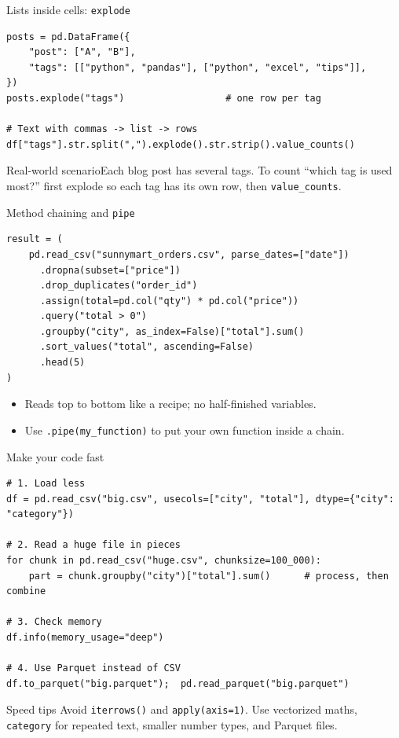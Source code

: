 \documentclass[aspectratio=169,10pt]{beamer}
\newcommand{\code}[1]{\texttt{#1}}
\newcommand{\scenario}[1]{\begin{exampleblock}{Real-world scenario}#1\end{exampleblock}}
\begin{document}
\begin{frame}[fragile]{Lists inside cells: \texttt{explode}}
\begin{lstlisting}
posts = pd.DataFrame({
    "post": ["A", "B"],
    "tags": [["python", "pandas"], ["python", "excel", "tips"]],
})
posts.explode("tags")                  # one row per tag

# Text with commas -> list -> rows
df["tags"].str.split(",").explode().str.strip().value_counts()
\end{lstlisting}
  \scenario{Each blog post has several tags. To count ``which tag is used most?'' first
  explode so each tag has its own row, then \code{value\_counts}.}
\end{frame}

\begin{frame}[fragile]{Method chaining and \texttt{pipe}}
\begin{lstlisting}
result = (
    pd.read_csv("sunnymart_orders.csv", parse_dates=["date"])
      .dropna(subset=["price"])
      .drop_duplicates("order_id")
      .assign(total=pd.col("qty") * pd.col("price"))
      .query("total > 0")
      .groupby("city", as_index=False)["total"].sum()
      .sort_values("total", ascending=False)
      .head(5)
)
\end{lstlisting}
  \begin{itemize}
    \item Reads top to bottom like a recipe; no half-finished variables.
    \item Use \code{.pipe(my\_function)} to put your own function inside a chain.
  \end{itemize}
\end{frame}

\begin{frame}[fragile]{Make your code fast}
\begin{lstlisting}
# 1. Load less
df = pd.read_csv("big.csv", usecols=["city", "total"], dtype={"city": "category"})

# 2. Read a huge file in pieces
for chunk in pd.read_csv("huge.csv", chunksize=100_000):
    part = chunk.groupby("city")["total"].sum()      # process, then combine

# 3. Check memory
df.info(memory_usage="deep")

# 4. Use Parquet instead of CSV
df.to_parquet("big.parquet");  pd.read_parquet("big.parquet")
\end{lstlisting}
  \begin{alertblock}{Speed tips}
    Avoid \code{iterrows()} and \code{apply(axis=1)}. Use vectorized maths, \code{category}
    for repeated text, smaller number types, and Parquet files.
  \end{alertblock}
\end{frame}
\end{document}
